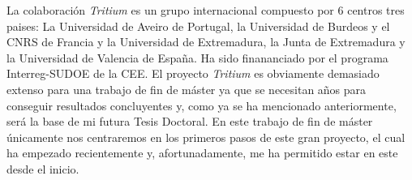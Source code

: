 La colaboración \textit{Tritium} es un grupo internacional compuesto por 6 centros  tres paises:  La Universidad de Aveiro de Portugal,  la Universidad de Burdeos y el CNRS de Francia y la Universidad de Extremadura, la Junta de Extremadura y la Universidad de Valencia de España. Ha sido finananciado por el programa Interreg-SUDOE de la CEE.  El proyecto \textit{Tritium} es  obviamente demasiado extenso para una trabajo de fin de máster ya que se necesitan años para conseguir resultados concluyentes y, como ya se ha mencionado anteriormente, será la base de mi futura Tesis Doctoral. En este trabajo de fin de máster únicamente nos centraremos en los primeros pasos de este gran proyecto, el cual ha empezado recientemente y, afortunadamente, me ha permitido estar en este desde el inicio.


